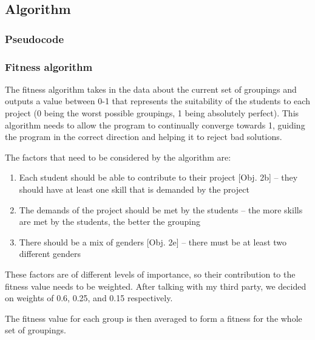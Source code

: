 \documentclass{article}
\begin{document}
\subsection{Algorithm}
\subsubsection{Pseudocode}



\subsubsection{Fitness algorithm}
The fitness algorithm takes in the data about the current set of groupings and outputs a value between 0-1 that represents the suitability of the students to each project (0 being the worst possible groupings, 1 being absolutely perfect). This algorithm needs to allow the program to continually converge towards 1, guiding the program in the correct direction and helping it to reject bad solutions.


The factors that need to be considered by the algorithm are:
\begin{enumerate}
    \item Each student should be able to contribute to their project [Obj. 2b] -- they should have at least one skill that is demanded by the project
    \item The demands of the project should be met by the students -- the more skills are met by the students, the better the grouping
    \item There should be a mix of genders [Obj. 2e] -- there must be at least two different genders
\end{enumerate}

\noindent These factors are of different levels of importance, so their contribution to the fitness value needs to be weighted. After talking with my third party, we decided on weights of 0.6, 0.25, and 0.15 respectively.

The fitness value for each group is then averaged to form a fitness for the whole set of groupings.
\end{document}
